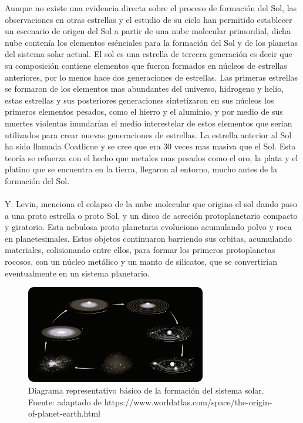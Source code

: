 \documentclass[12pt]{article}
\begin{document}
Aunque no existe una evidencia directa sobre el proceso de formación del Sol, las observaciones en 
otras estrellas y el estudio de su ciclo han permitido establecer un escenario de origen del Sol a 
partir de una nube molecular primordial\parencite{TheFormationandEvolutionoftheSolarSystem}, dicha nube 
contenía los elementos esénciales para la formación del Sol y de los planetas del sistema solar actual. 
El sol es una estrella de tercera generación es decir que su composición contiene elementos que fueron 
formados en núcleos de estrellas anteriores, por lo menos hace dos generaciones de estrellas. Las 
primeras estrellas se formaron de los elementos mas abundantes del universo, hidrogeno y helio, estas 
estrellas y sus posteriores generaciones sintetizaron en sus núcleos los primeros elementos pesados, como 
el hierro y el aluminio, y por medio de sus muertes violentas inundarían el medio interestelar de estos 
elementos que serian utilizados para crear nuevas generaciones de estrellas. La estrella anterior al Sol 
ha sido llamada Coatlicue y se cree que era 30 veces mas masiva que el Sol. Esta teoría se refuerza con 
el hecho que metales mas pesados como el oro, la plata y el platino que se encuentra en la tierra, llegaron 
al entorno, mucho antes de la formación del Sol\parencite{Sun}.\\
\\
Y. Levin\parencite{levin2003origin}, menciona el colapso de la nube molecular que origino el sol dando 
paso a una proto estrella o proto Sol, y un disco de acreción protoplanetario compacto y giratorio. 
Esta nebulosa proto planetaria evoluciono acumulando polvo y roca en planetesimales. Estos objetos 
continuaron barriendo sus orbitas, acumulando materiales, colisionando entre ellos, para formar los 
primeros protoplanetas rocosos, con un núcleo metálico y un manto de silicatos, que se convertirían 
eventualmente en un sistema planetario.
\begin{figure}[H]
    \includegraphics[width=0.7\textwidth]{images/System_solar_origin.png}
    \centering
    \caption{Diagrama representativo básico de la formación del sistema solar.
    Fuente: adaptado de https://www.worldatlas.com/space/the-origin-of-planet-earth.html}
    \label{fig:formation_solar_System}
\end{figure}
\end{document}
